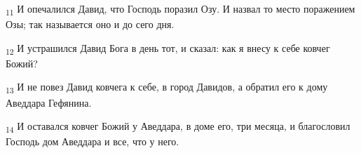 \begin{tcolorbox}
\textsubscript{11} И опечалился Давид, что Господь поразил Озу. И назвал то место поражением Озы; так называется оно и до сего дня.
\end{tcolorbox}
\begin{tcolorbox}
\textsubscript{12} И устрашился Давид Бога в день тот, и сказал: как я внесу к себе ковчег Божий?
\end{tcolorbox}
\begin{tcolorbox}
\textsubscript{13} И не повез Давид ковчега к себе, в город Давидов, а обратил его к дому Аведдара Гефянина.
\end{tcolorbox}
\begin{tcolorbox}
\textsubscript{14} И оставался ковчег Божий у Аведдара, в доме его, три месяца, и благословил Господь дом Аведдара и все, что у него.
\end{tcolorbox}
